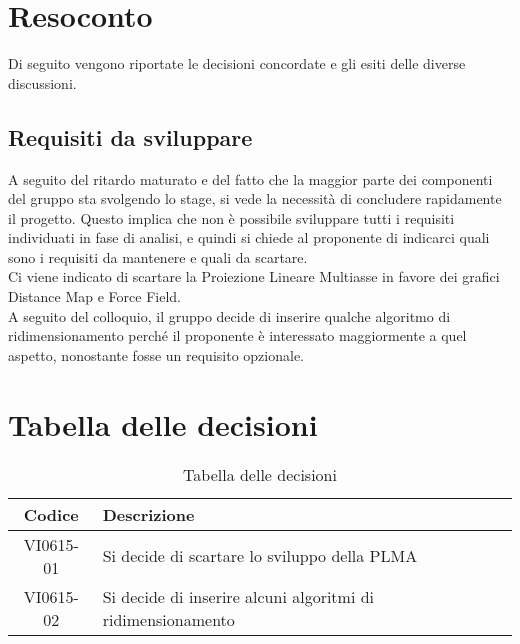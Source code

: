 \documentclass{article}
\begin{document}
\newpage
\section{Resoconto}
\label{sec:resoconto}

Di seguito vengono riportate le decisioni concordate e gli esiti delle diverse discussioni.

\subsection{Requisiti da sviluppare}
\label{itm:1}

A seguito del ritardo maturato e del fatto che la maggior parte dei componenti del gruppo sta svolgendo lo stage, si vede la necessità di concludere rapidamente il progetto. Questo implica che non è possibile sviluppare tutti i requisiti individuati in fase di analisi, e quindi si chiede al proponente di indicarci quali sono i requisiti da mantenere e quali da scartare. \\
Ci viene indicato di scartare la Proiezione Lineare Multiasse in favore dei grafici Distance Map e Force Field. \\
A seguito del colloquio, il gruppo decide di inserire qualche algoritmo di ridimensionamento perché il proponente è interessato maggiormente a quel aspetto, nonostante fosse un requisito opzionale. \\

\section{Tabella delle decisioni}%
\label{sub:decisioni}

\begin{table}[!ht]
	\centering
	\begin{tabular}{|c|p{13cm}|}
		\hline
		\rowcolor{lightgray}
		\textbf{Codice} & \textbf{Descrizione} \\
		\hline
			VI0615-01 & Si decide di scartare lo sviluppo della PLMA \\
            		VI0615-02 & Si decide di inserire alcuni algoritmi di ridimensionamento \\
		\hline
	\end{tabular}
	\caption{Tabella delle decisioni}
\end{table}
\end{document}
